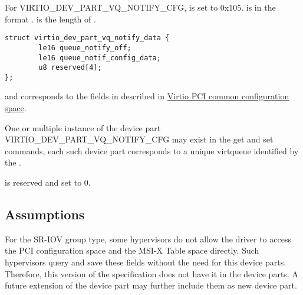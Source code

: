 For VIRTIO_DEV_PART_VQ_NOTIFY_CFG,  is set to 0x105.
 is in the format .
 is the length of .

\begin{lstlisting}
struct virtio_dev_part_vq_notify_data {
        le16 queue_notify_off;
        le16 queue_notif_config_data;
        u8 reserved[4];
};
\end{lstlisting}

 and  corresponds to the
fields in  described in
\hyperref[sec:Virtio Transport Options / Virtio Over PCI Bus / PCI Device Layout / Common configuration structure layout]{Virtio PCI common configuration space}.

One or multiple instance of the device part VIRTIO_DEV_PART_VQ_NOTIFY_CFG may exist
in the get and set commands, each such device part corresponds to a unique
virtqueue identified by the .

 is reserved and set to 0.

\subsection{Assumptions}
For the SR-IOV group type, some hypervisors do not allow the driver to access
the PCI configuration space and the MSI-X Table space directly. Such hypervisors
query and save these fields without the need for this device parts.
Therefore, this version of the specification does not have it in the device parts. A future
extension of the device part may further include them as new device part.
